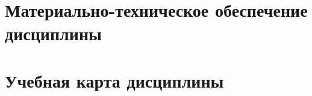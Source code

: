 \section{Материально-техническое обеспечение дисциплины}

	

\clearpage
\section{Учебная карта дисциплины}

% 
% 


